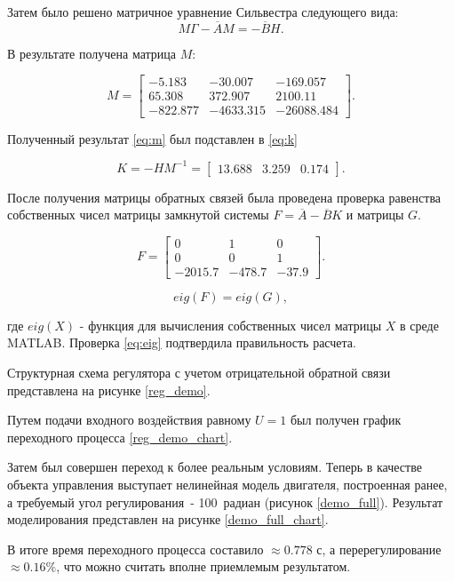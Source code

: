 Затем было решено матричное уравнение Сильвестра следующего вида:
$$
  M\Gamma-\overline{A}M=-\overline{B}H.
$$

В результате получена матрица $M$:

\begin{equation}
  M=\begin{bmatrix}-5.183&-30.007&-169.057\\65.308&372.907&2100.11\\-822.877&-4633.315&-26088.484\end{bmatrix}.
  \label{eq:m}
\end{equation}

Полученный результат \ref{eq:m} был подставлен в \ref{eq:k}

\begin{equation}
  K=-HM^{-1}=\begin{bmatrix}13.688&3.259&0.174\end{bmatrix}.
  \label{eq:k}
\end{equation}

После получения матрицы обратных связей была проведена проверка равенства
собственных чисел матрицы замкнутой системы $F = \overline{A} - \overline{B}K$ и матрицы $G$.

$$
  F = \begin{bmatrix}0&1&0\\0&0&1\\-2015.7&-478.7&-37.9\end{bmatrix}.
$$

\begin{equation}
  eig(F) = eig(G),
  \label{eq:eig}
\end{equation}

где $eig(X)$ - функция для вычисления собственных чисел матрицы $X$ в среде MATLAB.
Проверка \ref{eq:eig} подтвердила правильность расчета.

Структурная схема регулятора с учетом отрицательной обратной связи представлена на рисунке \ref{reg_demo}.


Путем подачи входного воздействия равному $U=1$ был получен график переходного процесса \ref{reg_demo_chart}.


Затем был совершен переход к более реальным условиям. Теперь в качестве объекта управления
выступает нелинейная модель двигателя, построенная ранее, а требуемый угол 
регулирования~- 100~радиан (рисунок \ref{demo_full}). Результат моделирования 
представлен на рисунке \ref{demo_full_chart}.



В итоге время переходного процесса составило $\approx0.778$ с, а перерегулирование $\approx0.16\%$,
что можно считать вполне приемлемым результатом.